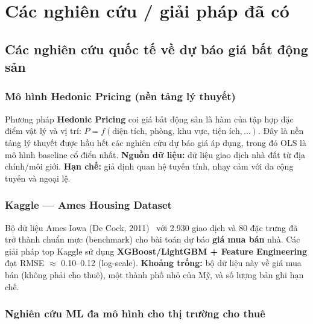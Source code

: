 \section{Các nghiên cứu / giải pháp đã có}
\label{sec:related}

\subsection{Các nghiên cứu quốc tế về dự báo giá bất động sản}

\subsubsection*{Mô hình Hedonic Pricing (nền tảng lý thuyết)}

Phương pháp \textbf{Hedonic Pricing} \cite{rosen1974hedonic} coi giá bất động sản là hàm
của tập hợp đặc điểm vật lý và vị trí: $P = f(\text{diện tích, phòng, khu vực, tiện ích}, \ldots)$.
Đây là nền tảng lý thuyết được hầu hết các nghiên cứu dự báo giá áp dụng,
trong đó OLS là mô hình baseline cổ điển nhất.
\textbf{Nguồn dữ liệu:} dữ liệu giao dịch nhà đất từ địa chính/môi giới.
\textbf{Hạn chế:} giả định quan hệ tuyến tính, nhạy cảm với đa cộng tuyến và ngoại lệ.

\subsubsection*{Kaggle — Ames Housing Dataset}

Bộ dữ liệu Ames Iowa (De Cock, 2011)~\cite{decock2011ames} với 2.930 giao dịch và 80 đặc trưng
đã trở thành chuẩn mực (benchmark) cho bài toán dự báo \textbf{giá mua bán} nhà.
Các giải pháp top Kaggle sử dụng \textbf{XGBoost/LightGBM + Feature Engineering} đạt
RMSE $\approx$ 0.10--0.12 (log-scale).
\textbf{Khoảng trống:} bộ dữ liệu này về giá mua bán (không phải cho thuê), một thành phố nhỏ
của Mỹ, và số lượng bản ghi hạn chế.

\subsubsection*{Nghiên cứu ML đa mô hình cho thị trường cho thuê}

